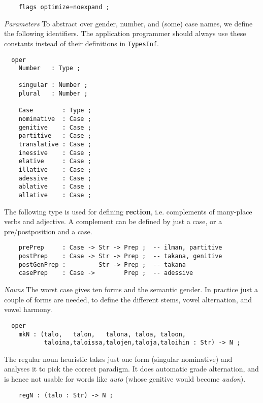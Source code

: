 \documentclass[11pt,a4paper]{article}
\newcommand{\subsubsubsection}[1]{\textit{#1}}
\begin{document}
\begin{verbatim}
    flags optimize=noexpand ;
\end{verbatim}

\subsubsubsection{Parameters}
To abstract over gender, number, and (some) case names, 
we define the following identifiers. The application programmer
should always use these constants instead of their definitions
in \texttt{TypesInf}.

\begin{verbatim}
  oper
    Number   : Type ;
  
    singular : Number ;
    plural   : Number ;
  
    Case        : Type ;
    nominative  : Case ; 
    genitive    : Case ; 
    partitive   : Case ; 
    translative : Case ; 
    inessive    : Case ; 
    elative     : Case ; 
    illative    : Case ; 
    adessive    : Case ; 
    ablative    : Case ; 
    allative    : Case ;
\end{verbatim}

The following type is used for defining \textbf{rection}, i.e. complements
of many-place verbs and adjective. A complement can be defined by
just a case, or a pre/postposition and a case.

\begin{verbatim}
    prePrep     : Case -> Str -> Prep ;  -- ilman, partitive
    postPrep    : Case -> Str -> Prep ;  -- takana, genitive
    postGenPrep :         Str -> Prep ;  -- takana
    casePrep    : Case ->        Prep ;  -- adessive
\end{verbatim}

\subsubsubsection{Nouns}
The worst case gives ten forms and the semantic gender.
In practice just a couple of forms are needed, to define the different
stems, vowel alternation, and vowel harmony.

\begin{verbatim}
  oper
    mkN : (talo,   talon,   talona, taloa, taloon,
           taloina,taloissa,talojen,taloja,taloihin : Str) -> N ;
\end{verbatim}

The regular noun heuristic takes just one form (singular
nominative) and analyses it to pick the correct paradigm.
It does automatic grade alternation, and is hence not usable
for words like \textit{auto} (whose genitive would become \textit{audon}).

\begin{verbatim}
    regN : (talo : Str) -> N ;
\end{verbatim}
\end{document}
